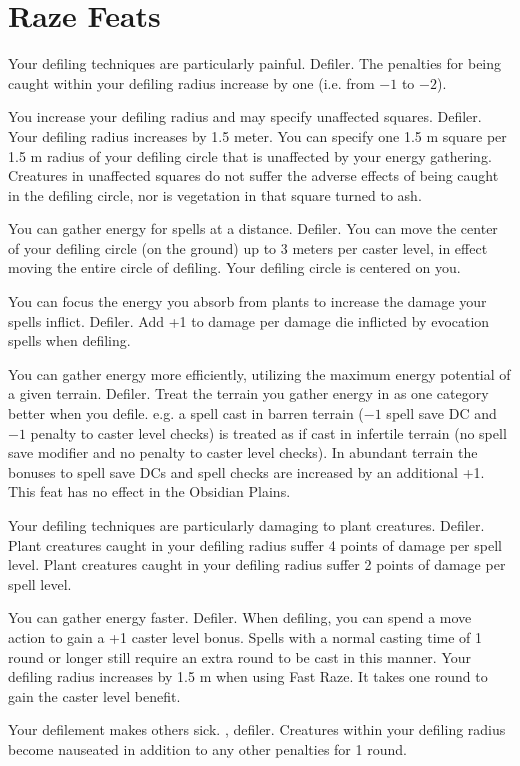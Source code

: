 \section{Raze Feats}

{Your defiling techniques are particularly painful.}
{Defiler.}
{The penalties for being caught within your defiling radius increase by one (i.e. from $-1$ to $-2$).}
{}{}

{You increase your defiling radius and may specify unaffected squares.}
{Defiler.}
{Your defiling radius increases by 1.5 meter. You can specify one 1.5 m square per 1.5 m radius of your defiling circle that is unaffected by your energy gathering. Creatures in unaffected squares do not suffer the adverse effects of being caught in the defiling circle, nor is vegetation in that square turned to ash.}
{}{}

{You can gather energy for spells at a distance.}
{Defiler.}
{You can move the center of your defiling circle (on the ground) up to 3 meters per caster level, in effect moving the entire circle of defiling.}
{Your defiling circle is centered on you.}
{}

{You can focus the energy you absorb from plants to increase the damage your spells inflict.}
{Defiler.}
{Add +1 to damage per damage die inflicted by evocation spells when defiling.}
{}{}

{You can gather energy more efficiently, utilizing the maximum energy potential of a given terrain.}
{Defiler.}
{Treat the terrain you gather energy in as one category better when you defile. e.g. a spell cast in barren terrain ($-1$ spell save DC and $-1$ penalty to caster level checks) is treated as if cast in infertile terrain (no spell save modifier and no penalty to caster level checks). In abundant terrain the bonuses to spell save DCs and spell checks are increased by an additional +1. This feat has no effect in the Obsidian Plains.}
{}{}

{Your defiling techniques are particularly damaging to plant creatures.}
{Defiler.}
{Plant creatures caught in your defiling radius suffer 4 points of damage per spell level.}
{Plant creatures caught in your defiling radius suffer 2 points of damage per spell level.}
{}

{You can gather energy faster.}
{Defiler.}
{When defiling, you can spend a move action to gain a +1 caster level bonus. Spells with a normal casting time of 1 round or longer still require an extra round to be cast in this manner. Your defiling radius increases by 1.5 m when using Fast Raze.}
{It takes one round to gain the caster level benefit.}
{}

{Your defilement makes others sick.}
{, defiler.}
{Creatures within your defiling radius become nauseated in addition to any other penalties for 1 round.}
{}{}